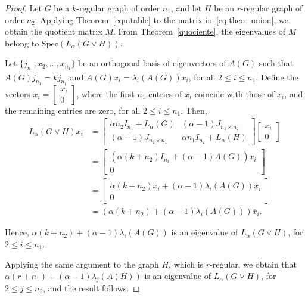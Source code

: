 \documentclass{article}
\begin{document}
\begin{proof}
Let $G$ be a $k$-regular graph of order $n_1$, and let $H$ be an $r$-regular graph of order $n_2$. Applying Theorem~\ref{equitable} to the matrix in~\eqref{eq:theo_union}, we obtain the quotient matrix $M$. From Theorem~\ref{quociente}, the eigenvalues of $M$ belong to $\mathrm{Spec}(L_\alpha(G \lor H))$. 

Let $\{j_{n_1}, x_2, \ldots, x_{n_1} \}$ be an orthogonal basis of eigenvectors of $A(G)$ such that $A(G)j_{n_1} = kj_{n_1}$ and $A(G)x_i = \lambda_i(A(G))x_i$, for all $2\leq i \leq n_1$. Define the vectors $\overline{x}_i = \begin{bmatrix} x_i \\ 0 \end{bmatrix}$, where the first $n_1$ entries of $\overline{x}_i$ coincide with those of $x_i$, and the remaining entries are zero, for all $2\leq i \leq n_1$. Then,
\begin{align*}
L_\alpha(G \lor H) \overline{x}_i&= \begin{bmatrix}
\alpha n_2 I_{n_1} + L_\alpha(G) & (\alpha-1) J_{n_1 \times n_2} \\
(\alpha-1) J_{n_2 \times n_1} & \alpha n_1 I_{n_2} + L_\alpha(H)
\end{bmatrix}
\begin{bmatrix}
x_i \\
0
\end{bmatrix} \\
&= \begin{bmatrix}
(\alpha (k + n_2) I_{n_1} + (\alpha-1)A(G))x_i \\
0
\end{bmatrix} \\
&= \begin{bmatrix}
\alpha (k + n_2) x_i + (\alpha-1)\lambda_i(A(G))x_i \\
0
\end{bmatrix} \\
&= \left(\alpha (k + n_2) + (\alpha-1)\lambda_i(A(G))\right)\overline{x}_i.
\end{align*}

Hence, $\alpha (k + n_2) + (\alpha-1)\lambda_i(A(G))$ is an eigenvalue of $L_\alpha(G \lor H)$, for $2\leq i \leq n_1$.

Applying the same argument to the graph $H$, which is $r$-regular, we obtain that $\alpha (r + n_1) + (\alpha-1)\lambda_j(A(H))$ is an eigenvalue of $L_\alpha(G \lor H)$, for $2\leq j \leq n_2$, and the result follows.

\end{proof}
\end{document}
